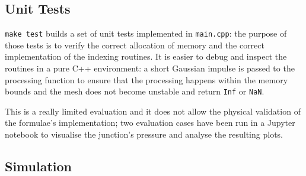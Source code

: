 \documentclass{article}
\begin{document}
\subsection{Unit Tests}

\texttt{make test} builds a set of unit tests implemented in
\texttt{main.cpp}: the purpose of those tests is to verify
the correct allocation of memory and the correct implementation
of the indexing routines. It is easier to debug and inspect
the routines in a pure C++ environment: a short Gaussian impulse
is passed to the processing function to ensure that the
processing happens within the memory bounds and the mesh
does not become unstable and return \texttt{Inf} or \texttt{NaN}.

This is a really limited evaluation and it does not allow
the physical validation of the formulae's implementation;
two evaluation cases have been run in a Jupyter notebook to
visualise the junction's pressure and analyse the resulting
plots.

\subsection{Simulation}
\end{document}
